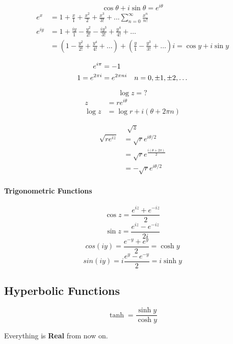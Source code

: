 \documentclass[svgnames]{article}   	%
\begin{document}
\[
  \cos \theta + i \sin \theta = e^{i\theta}
\]
\begin{align*}
  e^{x} &= 1 + \frac{x}{1} + \frac{x^2}{2} + \frac{x^3}{3!} + ...
  \sum_{n=0}^{\infty} \frac{x^n}{n!} \\
  e^{iy} &= 1 + \frac{iy}{1} - \frac{y^2}{2!} - \frac{iy^3}{3!} + \frac{y^4}{4!}
  + \dots \\
         &= \left(1 - \frac{y^2}{2!} + \frac{y^4}{4!} + \dots \right) + \left(\frac{y}{1}
- \frac{y^3}{3!} + \dots \right)i = \cos y + i \sin y 
\end{align*}

\begin{tcolorbox}[title = Euler's Identities]
  \begin{align*}
    e^{i\pi} &= -1 \\
    1 = e^{2\pi i} &= e^{2\pi n i} \hspace{10px} n = 0, \pm 1, \pm 2, \dots
\end{align*}

\end{tcolorbox}

\[
\log z = ?
\]
\begin{align*}
  z &= re^{i\theta} \\
  \log z &= \log r + i(\theta + 2 \pi n)
\end{align*}

\[
\sqrt{z}
\]
\begin{align*}
  \sqrt{re^{iz}} &= \sqrt{r} e^{i\theta / 2} \\
                 &= \sqrt{r}e^{\frac{i(\theta + 2\pi)}{2}}\\
                 &= -\sqrt{r} e^{i\theta / 2}
\end{align*}

\paragraph{Trigonometric Functions}

\[
  \cos z = \frac{e^{iz} + e^{-iz}}{2}
\]
\[
  \sin z = \frac{e^{iz} - e^{-iz}}{2i}
\]
\[
  cos(iy) = \frac{e^{-y} + e^{y}}{2} = \cosh y
\]
\[
  sin(iy) = i\frac{e^y - e^{-y}}{2} = i\sinh y
\]

\subsection{Hyperbolic Functions}

\[
\tanh = \frac{\sinh y}{\cosh y}
\]

Everything is \textbf{Real} from now on.
\end{document}

